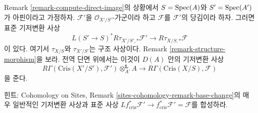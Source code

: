 \begin{remark}[기저변환 사상]
\label{remark-base-change}
Remark \ref{remark-compute-direct-image}의 상황에서
$S = \mathop{\mathrm{Spec}}(A)$와 $S' = \mathop{\mathrm{Spec}}(A')$가 아핀이라고 가정하자.
$\mathcal{F}'$을 $\mathcal{O}_{X'/S'}$-가군이라 하고
$\mathcal{F}$를 $\mathcal{F}'$의 당김이라 하자. 그러면 표준
기저변환 사상
$$
L(S' \to S)^*R\tau_{X'/S', *}\mathcal{F}'
\longrightarrow
R\tau_{X/S, *}\mathcal{F}
$$
이 있다. 여기서 $\tau_{X/S}$와 $\tau_{X'/S'}$는 구조 사상이다.
Remark \ref{remark-structure-morphism}을 보라. 전역 단면 위에서는
이것이 $D(A)$ 안의 기저변환 사상
\begin{equation}
\label{equation-base-change-map}
R\Gamma(\text{Cris}(X'/S'), \mathcal{F}') \otimes^\mathbf{L}_{A'} A
\longrightarrow
R\Gamma(\text{Cris}(X/S), \mathcal{F})
\end{equation}
을 준다.

\medskip\noindent
힌트: Cohomology on Sites, Remark
\ref{sites-cohomology-remark-base-change}의 매우 일반적인 기저변환
사상과 표준 사상 $Lf_{\text{cris}}^*\mathcal{F}' \to
f_{\text{cris}}^*\mathcal{F}' = \mathcal{F}$를 합성하라.
\end{remark}

